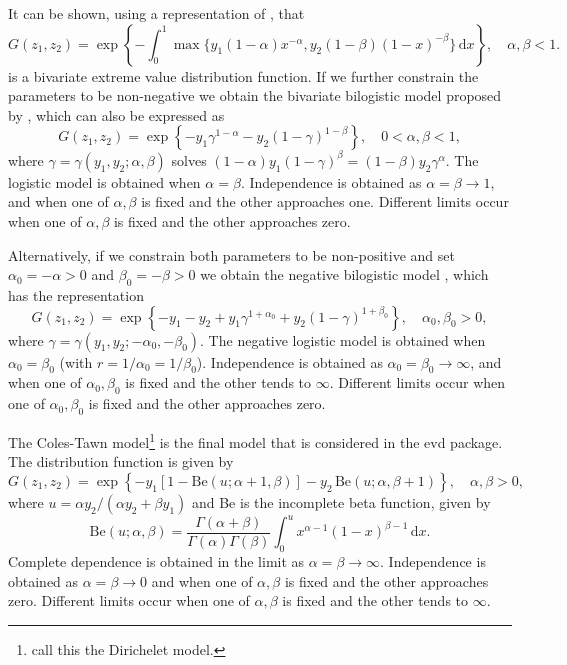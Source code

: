 \documentclass[11pt,a4paper]{article}
\begin{document}
It can be shown, using a representation of \citet{haan84}, that
\begin{equation*}
G(z_1,z_2) = \exp\left\{ - \int_0^1\max\{y_1(1-\alpha)x^{-\alpha},y_2(1-\beta)(1-x)^{-\beta}\} \, \text{d}x \right\}, \quad \alpha,\beta < 1.
\label{bilogistic}
\end{equation*}
is a bivariate extreme value distribution function. If we further constrain the parameters to be non-negative we obtain the bivariate bilogistic model proposed by \citet{smit90}, which can also be expressed as
\begin{equation}
G(z_1,z_2) = \exp\left\{ - y_1\gamma^{1-\alpha} - y_2(1-\gamma)^{1-\beta} \right\}, \quad 0 < \alpha,\beta <1,
\label{bilogdistn}
\end{equation}
where $\gamma=\gamma(y_1,y_2;\alpha,\beta)$ solves $(1-\alpha)y_1(1-\gamma)^\beta=(1-\beta)y_2\gamma^\alpha$.
The logistic model is obtained when $\alpha=\beta$.
Independence is obtained as $\alpha = \beta \rightarrow1$, and when one of $\alpha,\beta$ is fixed and the other approaches one.
Different limits occur when one of $\alpha,\beta$ is fixed and the other approaches zero.

Alternatively, if we constrain both parameters to be non-positive and set $\alpha_0=-\alpha > 0$ and $\beta_0=-\beta > 0$ we obtain the negative bilogistic model \citep{coletawn94}, which has the representation
\begin{equation*}
G(z_1,z_2) = \exp\left\{-y_1-y_2+y_1\gamma^{1+\alpha_0}+y_2(1-\gamma)^{1+\beta_0} \right\}, \quad \alpha_0,\beta_0 > 0,
\end{equation*}
where $\gamma=\gamma(y_1,y_2;-\alpha_0,-\beta_0)$.
The negative logistic model is obtained when $\alpha_0=\beta_0$ (with $r = 1/\alpha_0 = 1/\beta_0$).
Independence is obtained as $\alpha_0 = \beta_0 \rightarrow\infty$, and when one of $\alpha_0,\beta_0$ is fixed and the other tends to $\infty$.
Different limits occur when one of $\alpha_0,\beta_0$ is fixed and the other approaches zero.

The Coles-Tawn model\footnote{\citet{coletawn91} call this the Dirichelet model.}
\citep{coletawn91} is the final model that is considered in the evd package.  
The distribution function is given by
\begin{equation*}
G(z_1,z_2) = \exp\left\{-y_1[1-\text{Be}(u;\alpha+1,\beta)] - y_2\,\text{Be}(u;\alpha,\beta+1) \right\}, \quad \alpha,\beta > 0,
\end{equation*}
where $u=\alpha y_2/(\alpha y_2+\beta y_1)$ and Be is the incomplete beta function, given by
\begin{equation*}
\text{Be}(u;\alpha,\beta) = \frac{\Gamma(\alpha+\beta)}{\Gamma(\alpha)\Gamma(\beta)} \int_0^u x^{\alpha-1}(1-x)^{\beta-1}  \, \text{d}x.
\end{equation*}
Complete dependence is obtained in the limit as $\alpha = \beta \rightarrow\infty$.
Independence is obtained as $\alpha = \beta \rightarrow0$ and when one of $\alpha,\beta$ is fixed and the other approaches zero.
Different limits occur when one of $\alpha,\beta$ is fixed and the other tends to $\infty$.
\end{document}
